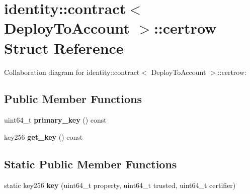 \hypertarget{structidentity_1_1contract_1_1certrow}{}\section{identity\+:\+:contract$<$ Deploy\+To\+Account $>$\+:\+:certrow Struct Reference}
\label{structidentity_1_1contract_1_1certrow}


Collaboration diagram for identity\+:\+:contract$<$ Deploy\+To\+Account $>$\+:\+:certrow\+:
\subsection*{Public Member Functions}
\begin{DoxyCompactItemize}
\item 
\mbox{\label{structidentity_1_1contract_1_1certrow_a96e316c6e38fed226269f1ebab598c2c}} 
uint64\+\_\+t {\bfseries primary\+\_\+key} () const
\item 
\mbox{\label{structidentity_1_1contract_1_1certrow_ae3c45721f0164dcfbeaafa82831e30cf}} 
key256 {\bfseries get\+\_\+key} () const
\end{DoxyCompactItemize}
\subsection*{Static Public Member Functions}
\begin{DoxyCompactItemize}
\item 
\mbox{\label{structidentity_1_1contract_1_1certrow_a7723c149aa9963412a68ca9c9bcce8d7}} 
static key256 {\bfseries key} (uint64\+\_\+t property, uint64\+\_\+t trusted, uint64\+\_\+t certifier)
\end{DoxyCompactItemize}
